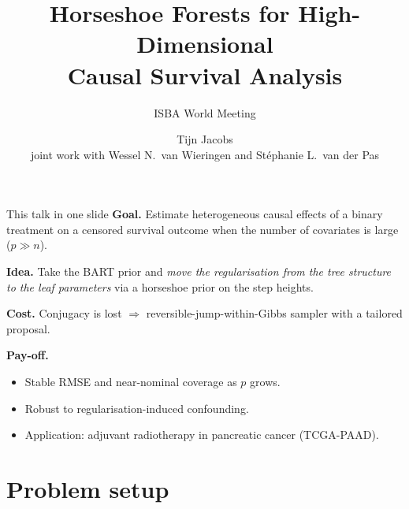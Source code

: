 \documentclass[10pt,aspectratio=169]{beamer}
\title{Horseshoe Forests for High-Dimensional\\ Causal Survival Analysis}
\subtitle{ISBA World Meeting}
\date{}
\author{Tijn Jacobs \\
\small joint work with Wessel N.\ van Wieringen and St\'ephanie L.\ van der Pas}
\institute{Vrije Universiteit Amsterdam}
\begin{document}
\maketitle

\begin{frame}{This talk in one slide}
\textbf{Goal.} Estimate heterogeneous causal effects of a binary treatment on a censored survival outcome when the number of covariates is large ($p \gg n$).
\bigskip

\textbf{Idea.} Take the BART prior and \emph{move the regularisation from the tree structure to the leaf parameters} via a horseshoe prior on the step heights.
\bigskip

\textbf{Cost.} Conjugacy is lost $\Rightarrow$ reversible-jump-within-Gibbs sampler with a tailored proposal.
\bigskip

\textbf{Pay-off.}
\begin{itemize}
  \item Stable RMSE and near-nominal coverage as $p$ grows.
  \item Robust to regularisation-induced confounding.
  \item Application: adjuvant radiotherapy in pancreatic cancer (TCGA-PAAD).
\end{itemize}
\end{frame}

\section{Problem setup}
\end{document}
